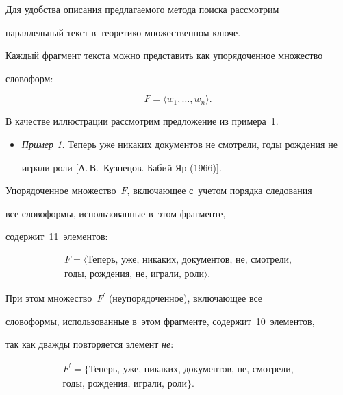 Для удобства описания предлагаемого метода поиска рассмотрим 


параллельный текст в~теоретико-множественном ключе.





Каждый фрагмент текста можно представить как упорядоченное множество 


словоформ:


$$


     F = \langle w_1, \ldots , w_n\rangle.


     $$





В качестве иллюстрации рассмотрим предложение из примера~1.





\begin{itemize}


\item[\,]


\textit{Пример 1.} Теперь уже никаких документов не смотрели, годы рождения не 


играли роли [А.\,В.~Кузнецов. Бабий Яр (1966)].


\end{itemize}





Упорядоченное множество~$F$, включающее с~учетом порядка следования 


все словоформы, использованные в~этом фрагменте, 


содержит~11~элементов:


\begin{multline*}


F = \langle \mbox{Теперь,\ уже,\ никаких,\ документов,\ не,\ смотрели,}\\


\mbox{годы,\ рождения,\ не,\ играли,\ роли}\rangle.


\end{multline*}


При этом множество~$F^\prime$ (неупорядоченное), включающее все 


словоформы, использованные в~этом фрагменте, содержит~10~элементов, 


так как дваж\-ды повторяется элемент \textit{не}:


\begin{multline*}


F^\prime = \{\mbox{Теперь,\ уже,\ никаких,\ документов,\ не,\ 


смотрели,}\\


\mbox{годы,\ рождения,\ играли,\ роли}\}.


\end{multline*}


